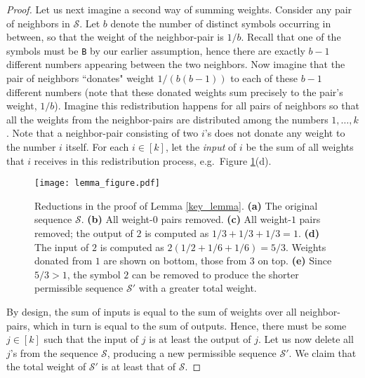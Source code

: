 \documentclass[11pt,reqno]{amsart} %
\numberwithin{equation}{section}
\newcommand{\s}{\mathcal{S}}
\theoremstyle{definition}
\begin{document}
\begin{proof}
Let us next imagine a second way of summing weights. 
Consider any pair of neighbors in $\s$. 
Let $b$ denote the number of distinct symbols occurring in between, so that the weight of the neighbor-pair is $1/b$. 
Recall that one of the symbols must be \texttt{B} by our earlier assumption, hence there are exactly $b-1$ different numbers appearing between the two neighbors. 
Now imagine that the pair of neighbors ``donates" weight
$1/(b(b-1))$ to each of these $b-1$ different numbers (note that these donated weights sum precisely to the pair's weight, $1/b$). 
Imagine this redistribution happens for all pairs of neighbors so that all the weights from the neighbor-pairs are distributed among the numbers $1,\dots,k$. 
Note that a neighbor-pair consisting of two $i$'s does not donate any weight to the number $i$ itself. 
For each $i\in[k]$, let the \emph{input} of $i$ be the sum of all weights that $i$ receives in this redistribution process, e.g.~Figure \ref{lemma_figure}(d).

\begin{figure}[!ht]
\centering
\texttt{[image: lemma\_figure.pdf]}
\caption{{Reductions in the proof of Lemma \ref{key_lemma}.
\textbf{{(a)}} The original sequence $\s$.
\textbf{{(b)}} All weight-$0$ pairs removed.
\textbf{{(c)}} All weight-$1$ pairs removed; the output of $2$ is computed as $1/3+1/3+1/3 = 1$.
\textbf{{(d)}} The input of $2$ is computed as $2(1/2+1/6+1/6) = 5/3$.  Weights donated from $1$ are shown on bottom, those from $3$ on top.
\textbf{{(e)}} Since $5/3 > 1$, the symbol $2$ can be removed to produce the shorter permissible sequence $\s'$ with a greater total weight.
}}
\label{lemma_figure}
\end{figure}

By design, the sum of inputs is equal to the sum of weights over all neighbor-pairs, which in turn is equal to the sum of outputs.
Hence, there must be some $j\in [k]$ such that the input of $j$ is at least the output of $j$.
Let us now delete all $j$'s from the sequence $\s$, producing a new permissible sequence $\s'$. 
We claim that the total weight of $\s'$ is at least that of $\s$. 


\end{proof}
\end{document}
